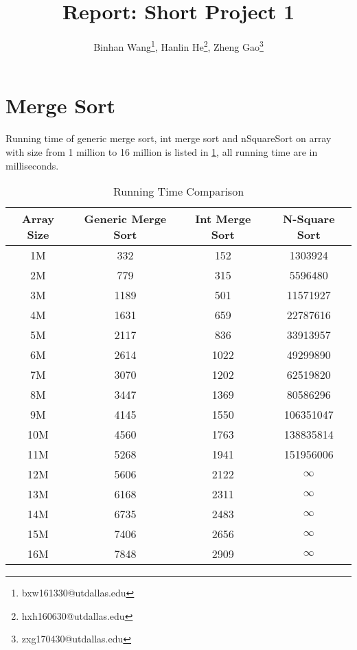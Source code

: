 \documentclass[10pt]{article}
\title{\vspace*{-1em}Report: Short Project 1}
\author{Binhan Wang\footnote{bxw161330@utdallas.edu}, Hanlin He\footnote{hxh160630@utdallas.edu},
Zheng Gao\footnote{zxg170430@utdallas.edu}}
\begin{document}
\maketitle

\section{Merge Sort}

Running time of generic merge sort, int merge sort and nSquareSort on array
with size from 1 million to 16 million is listed in \cref{r1}, all running time
are in milliseconds.

\begin{table}[H]
    \centering
    \caption{Running Time Comparison}\label{r1}
    \begin{tabular}{c|ccc}
        Array Size & Generic Merge Sort & Int Merge Sort & N-Square Sort \\\hline\hline
        1M & 332 & 152 & 1303924\\
        2M & 779 & 315 & 5596480 \\
        3M & 1189 & 501 & 11571927 \\
        4M & 1631 & 659 & 22787616 \\
        5M & 2117 & 836 & 33913957 \\
        6M & 2614 & 1022 & 49299890 \\
        7M & 3070 & 1202 & 62519820 \\
        8M & 3447 & 1369 & 80586296 \\
        9M & 4145 & 1550 & 106351047 \\
        10M & 4560 & 1763 & 138835814 \\
        11M & 5268 & 1941 & 151956006 \\
        12M & 5606 & 2122 & $\infty$ \\
        13M & 6168 & 2311 & $\infty$ \\
        14M & 6735 & 2483 & $\infty$ \\
        15M & 7406 & 2656 & $\infty$ \\
        16M & 7848 & 2909 & $\infty$ \\
    \end{tabular}
\end{table}
\end{document}
